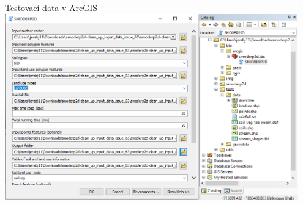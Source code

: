         \begin{frame}
            Testovací data v ArcGIS\vspace{1em}
            \includegraphics[width=0.95\textwidth]{obr/arcmap01.png}
        \end{frame}

